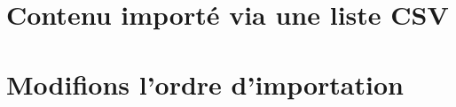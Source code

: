 \documentclass[varwidth, border = 3pt]{standalone}
\begin{document}
\section*{Contenu importé via une liste CSV}



\section*{Modifions l'ordre d'importation}

\end{document}
